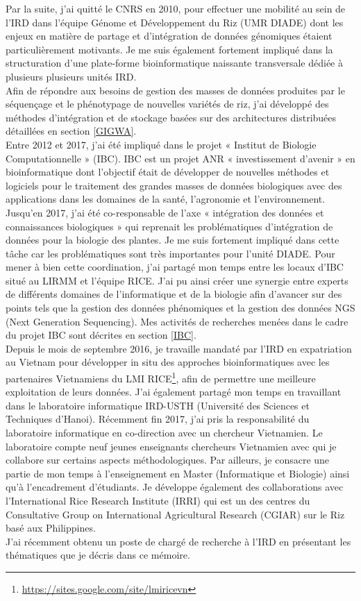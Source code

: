 Par la suite, j’ai quitté le CNRS en 2010, pour effectuer une mobilité au sein de l’IRD dans l’équipe Génome et Développement du Riz (UMR DIADE) dont les enjeux en matière de partage et d’intégration de données génomiques étaient particulièrement motivants. Je me suis également fortement impliqué dans la structuration d’une plate-forme bioinformatique naissante transversale dédiée à plusieurs plusieurs unités IRD. \\
Afin de répondre aux besoins de gestion des masses de données produites par le séquençage et le phénotypage de nouvelles variétés de riz, j’ai développé des méthodes d’intégration et de stockage basées sur des architectures distribuées détaillées en section \ref{GIGWA}. \\
Entre 2012 et 2017, j'ai été impliqué dans le projet « Institut de Biologie Computationnelle » (IBC). IBC est un projet ANR « investissement d’avenir » en bioinformatique dont l’objectif était de développer de nouvelles méthodes et logiciels pour le traitement des grandes masses de données biologiques avec des applications dans les domaines de la santé, l’agronomie et l’environnement. 
Jusqu'en 2017, j'ai été co-responsable de l’axe « intégration des données et connaissances biologiques » qui reprenait les problématiques d’intégration de données pour la biologie des plantes. Je me suis fortement impliqué dans cette tâche car les problématiques sont très importantes pour l’unité DIADE. Pour mener à bien cette coordination, j’ai partagé mon temps entre les locaux d’IBC situé au LIRMM et l’équipe RICE. J’ai pu ainsi créer une synergie entre experts de différents domaines de l’informatique et de la biologie afin d’avancer sur des points tels que la gestion des données phénomiques et la gestion des données NGS (Next Generation Sequencing). Mes activités de recherches menées dans le cadre du projet IBC sont décrites en section \ref{IBC}. \\
Depuis le mois de septembre 2016, je travaille mandaté par l'IRD en expatriation au Vietnam pour développer in situ des approches bioinformatiques avec les partenaires Vietnamiens du LMI RICE\footnote{\url{https://sites.google.com/site/lmiricevn}}, afin de permettre une meilleure exploitation de leurs données. J'ai également partagé mon temps en travaillant dans le laboratoire informatique IRD-USTH (Université des Sciences et Techniques d’Hanoi). Récemment fin 2017, j’ai pris la responsabilité du laboratoire informatique en co-direction avec un chercheur Vietnamien. Le laboratoire compte neuf jeunes enseignants chercheurs Vietnamien avec qui je collabore sur certains aspects méthodologiques. Par ailleurs, je consacre une partie de mon temps à l’enseignement en Master (Informatique et Biologie) ainsi qu’à l’encadrement d’étudiants. Je développe également des collaborations avec l’International Rice Research Institute (IRRI) qui est un des centres du Consultative Group on International Agricultural Research (CGIAR) sur le Riz basé aux Philippines.\\
J'ai récemment obtenu un poste de chargé de recherche à l'IRD en présentant les thématiques que je décris dans ce mémoire. \\




